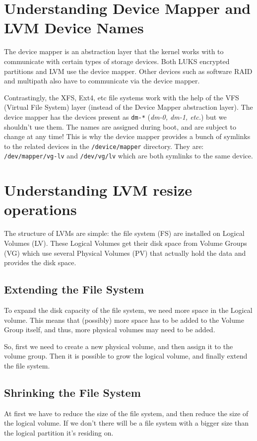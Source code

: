 \section{Understanding Device Mapper and LVM Device Names}
The device mapper is an abstraction layer that the kernel works with to communicate with certain types of storage devices. Both LUKS encrypted partitions and LVM use the device mapper. Other devices such as software RAID and multipath also have to communicate via the device mapper. 

Contrastingly, the XFS, Ext4, etc file systems work with the help of the VFS (Virtual File System) layer (instead of the Device Mapper abstraction layer). The device mapper has the devices present as \verb|dm-*| (\textit{dm-0, dm-1, etc.}) but we shouldn't use them. The names are assigned during boot, and are subject to change at any time! This is why the device mapper provides a bunch of symlinks to the related devices in the \verb|/device/mapper| directory. They are: \verb|/dev/mapper/vg-lv| and \verb|/dev/vg/lv| which are both symlinks to the same device. 

\section{Understanding LVM resize operations}
The structure of LVMs are simple: the file system (FS) are installed on Logical Volumes (LV). These Logical Volumes get their disk space from Volume Groups (VG) which use several Physical Volumes (PV) that actually hold the data and provides the disk space. 

\subsection{Extending the File System}
To expand the disk capacity of the file system, we need more space in the Logical volume. This means that (possibly) more space has to be added to the Volume Group itself, and thus, more physical volumes may need to be added. 

So, first we need to create a new physical volume, and then assign it to the volume group. Then it is possible to grow the logical volume, and finally extend the file system. 

\subsection{Shrinking the File System}
At first we have to reduce the size of the file system, and then reduce the size of the logical volume. If we don't there will be a file system with a bigger size than the logical partition it's residing on. 


